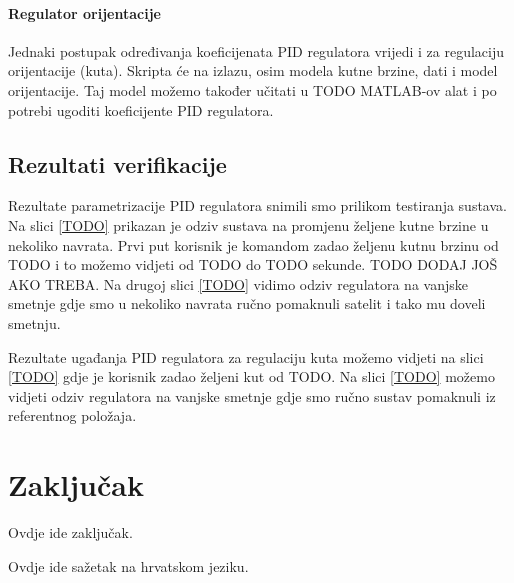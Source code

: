 \documentclass[times, utf8, diplomski, numeric]{templates/template}
\begin{document}
{{{            \subsubsection{Regulator orijentacije}{
                Jednaki postupak određivanja koeficijenata PID regulatora vrijedi i za regulaciju orijentacije (kuta). Skripta će na izlazu, osim modela kutne brzine, dati i model orijentacije. Taj model možemo također učitati u TODO MATLAB-ov alat i po potrebi ugoditi koeficijente PID regulatora.
            }
        }
    }

    \section{Rezultati verifikacije}{
        Rezultate parametrizacije PID regulatora snimili smo prilikom testiranja sustava. Na slici \ref{TODO} prikazan je odziv sustava na promjenu željene kutne brzine u nekoliko navrata. Prvi put korisnik je komandom zadao željenu kutnu brzinu od TODO i to možemo vidjeti od TODO do TODO sekunde. TODO DODAJ JOŠ AKO TREBA. Na drugoj slici \ref{TODO} vidimo odziv regulatora na vanjske smetnje gdje smo u nekoliko navrata ručno pomaknuli satelit i tako mu doveli smetnju.


        Rezultate ugađanja PID regulatora za regulaciju kuta možemo vidjeti na slici \ref{TODO} gdje je korisnik zadao željeni kut od TODO. Na slici \ref{TODO} možemo vidjeti odziv regulatora na vanjske smetnje gdje smo ručno sustav pomaknuli iz referentnog položaja.

    }
}

\chapter{Zaključak}{
    Ovdje ide zaključak.
}




\begin{sazetak}{
    Ovdje ide sažetak na hrvatskom jeziku.
}

\end{sazetak}

\begin{abstract}{
    Add abstract here.
}

\end{abstract}
\end{document}
